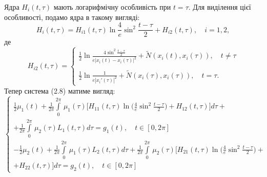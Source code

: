 \documentclass[a4 paper,12pt,ukrainian]{report}
\begin{document}
\hspace*{\parindent}Ядра $H_{i}(t,\tau)$ мають логарифмічну особливість при $t=\tau$. Для виділення цієї особливості, подамо ядра в такому вигляді:
\begin{equation*}
H_{i}(t,\tau)=H_{i1}(t,\tau)\ln{\frac{4}{e}\sin^2\frac{t-\tau}{2}}+H_{i2}(t,\tau), \quad i=1,2,
\end{equation*}
де
\begin{equation*}
H_{i2}(t,\tau)=\left\{
\begin{array}{l}
\displaystyle
\frac{1}{2}\ln{\frac{4\sin^2\frac{t-\tau}{2}}{e|x_{i}(t)-x_{i}(\tau)|^2}}+\tilde{N}(x_{i}(t),x_{i}(\tau)), \quad t\neq\tau\\ \\
\displaystyle
\frac{1}{2}\ln{\frac{1}{e|x_{i}'(\tau)|^2}}+\tilde{N}(x_{i}(\tau),x_{i}(\tau)), \quad t=\tau.
\end{array}
\right.
\end{equation*}
\hspace*{\parindent}Тепер система (2.8) матиме вигляд:
\begin{equation}
\left\{
\begin{array}{c}
\displaystyle
\frac{1}{2}\mu_1(t) + \frac{1}{2\pi}\int\limits_{0}^{2\pi} \,\mu_1(\tau)\Big[H_{11}(t,\tau)\ln{\Big(\frac{4}{e}\sin^2\frac{t-\tau}{2}\Big)}+H_{12}(t,\tau)\Big]d\tau+\\
\displaystyle
+\frac{1}{2\pi}\int\limits_{0}^{2\pi} \,\mu_2(\tau)L_{1}(t,\tau)d\tau=g_1(t),\quad  t \in [0, 2\pi]\\
\displaystyle
-\frac{1}{2}\mu_2(t) + \frac{1}{2\pi}\int\limits_{0}^{2\pi} \,\mu_1(\tau)L_{2}(t,\tau)d\tau+\frac{1}{2\pi}\int\limits_{0}^{2\pi} \,\mu_2 (\tau)\Big[H_{21}(t,\tau)\ln{\Big(\frac{4}{e}\sin^2\frac{t-\tau}{2}\Big)}+\\
\displaystyle
+H_{22}(t,\tau)\Big]d\tau=g_2(t),\quad  t \in [0, 2\pi]
\end{array}
\right.
\end{equation}
\end{document}
